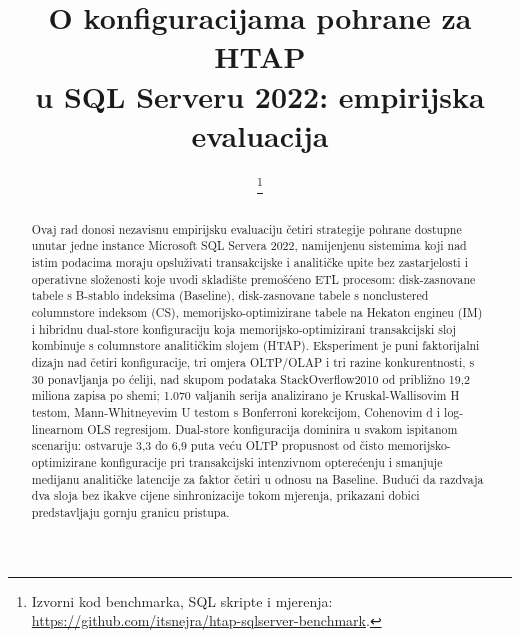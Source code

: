 \documentclass[10pt,conference,a4paper]{IEEEtran}
\begin{document}
\title{O konfiguracijama pohrane za HTAP\\
u SQL Serveru 2022: empirijska evaluacija}

\author{
\and
{}
%
\thanks{Izvorni kod benchmarka, SQL skripte i mjerenja:
\url{https://github.com/itsnejra/htap-sqlserver-benchmark}.}}

\maketitle
{}

\begin{abstract}
Ovaj rad donosi nezavisnu empirijsku evaluaciju četiri strategije pohrane
dostupne unutar jedne instance Microsoft SQL Servera 2022, namijenjenu
sistemima koji nad istim podacima moraju opsluživati transakcijske i
analitičke upite bez zastarjelosti i operativne složenosti koje uvodi
skladište premošćeno ETL procesom: disk-zasnovane tabele s B-stablo
indeksima (Baseline), disk-zasnovane tabele
s nonclustered columnstore indeksom (CS), memorijsko-optimizirane tabele na
Hekaton engineu (IM) i hibridnu dual-store konfiguraciju koja
memorijsko-optimizirani transakcijski sloj kombinuje s columnstore
analitičkim slojem (HTAP). Eksperiment je puni faktorijalni dizajn nad
četiri konfiguracije, tri omjera OLTP/OLAP i tri razine konkurentnosti, s 30
ponavljanja po ćeliji, nad skupom podataka StackOverflow2010 od približno
19,2 miliona zapisa po shemi; 1.070 valjanih serija analizirano je
Kruskal-Wallisovim H testom, Mann-Whitneyevim U testom s Bonferroni
korekcijom, Cohenovim d i log-linearnom OLS regresijom. Dual-store
konfiguracija dominira u svakom ispitanom scenariju: ostvaruje 3,3 do 6,9
puta veću OLTP propusnost od čisto memorijsko-optimizirane konfiguracije pri
transakcijski intenzivnom opterećenju i smanjuje medijanu analitičke
latencije za faktor četiri u odnosu na Baseline. Budući da razdvaja
dva sloja bez ikakve cijene sinhronizacije tokom mjerenja, prikazani dobici
predstavljaju gornju granicu pristupa.
\end{abstract}
\end{document}
